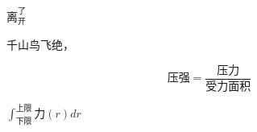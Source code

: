 \documentclass{article}
\begin{document}
$离_开^了$

千山鸟飞绝，


\[ 压强=\frac{压力}{受力面积} \]

$ \int_{下限}^{上限} 力(r)dr $
\end{document}
